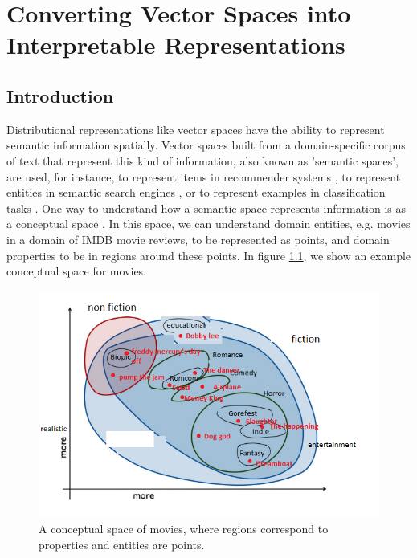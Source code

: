 \chapter{Converting Vector Spaces into Interpretable Representations}\label{Chapter3}
\section{Introduction}



Distributional representations like vector spaces have the ability to represent semantic information spatially. Vector spaces built from a domain-specific corpus of text that represent this kind of information, also known as 'semantic spaces', are used, for instance, to represent items in recommender systems \cite{Vasile:2016:MPE:2959100.2959160,liang2016factorization,van2016learning}, to represent entities in semantic search engines \cite{DBLP:conf/sigir/JameelBS17,van2017structural}, or to represent examples in classification tasks \cite{DBLP:conf/iccv/DemirelCI17}. %
One way to understand how a semantic space represents information is as a conceptual space \cite{Gardenfors2014}. In this space, we can understand domain entities, e.g. movies in a domain of IMDB movie reviews, to be represented as points, and domain properties to be in regions around these points. In figure \ref{ConceptualSpace}, we show an example conceptual space for movies. 


\begin{figure}[t]
	\includegraphics[width=\textwidth]{images/conceptualspace.png}
	\centering
	\caption{A conceptual space of movies, where regions correspond to properties and entities are points.}\label{ConceptualSpace}
\end{figure}

